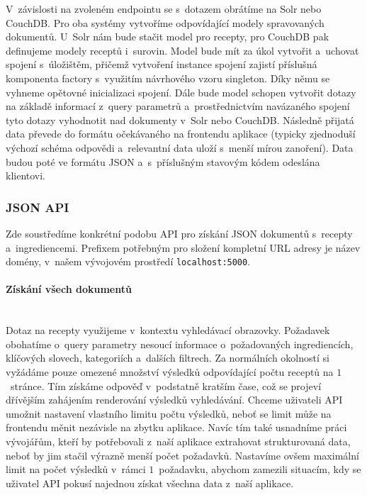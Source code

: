 V~závislosti na zvoleném endpointu se s~dotazem obrátíme na Solr nebo \,CouchDB. Pro oba systémy vytvoříme odpovídající modely spravovaných dokumentů. U~Solr nám bude stačit model pro recepty, pro CouchDB pak definujeme modely receptů i~surovin. Model bude mít za úkol vytvořit a~uchovat spojení s~úložištěm, přičemž vytvoření instance spojení zajistí příslušná komponenta factory s~využitím návrhového vzoru singleton. Díky němu se vyhneme opětovné inicializaci spojení. Dále bude model schopen vytvořit dotazy na základě informací z~query parametrů a~prostřednictvím navázaného spojení tyto dotazy vyhodnotit nad dokumenty v~Solr nebo CouchDB. Následně přijatá data převede do formátu očekávaného na frontendu aplikace (typicky zjednoduší výchozí schéma odpovědi a~relevantní data uloží s~menší mírou zanoření). Data budou poté ve formátu JSON a~s~příslušným stavovým kódem odeslána klientovi. 

\subsubsection{JSON API}

Zde soustředíme konkrétní podobu API pro získání JSON dokumentů s~recepty a~ingrediencemi. Prefixem potřebným pro složení kompletní URL adresy je název domény, v~našem vývojovém prostředí \texttt{localhost:5000}.

\paragraph{Získání všech dokumentů}\mbox{}\\

Dotaz na recepty využijeme v~kontextu vyhledávací obrazovky. Požadavek obohatíme o~query parametry nesoucí informace o~požadovaných ingrediencích, klíčových slovech, kategoriích a~dalších filtrech. Za normálních okolností si vyžádáme pouze omezené množství výsledků odpovídající počtu receptů na $1$~stránce. Tím získáme odpověď v~podstatně kratším čase, což se projeví dřívějším zahájením renderování výsledků vyhledávání. Chceme uživateli API umožnit nastavení vlastního limitu počtu výsledků, neboť se limit může na frontendu měnit nezávisle na zbytku aplikace. Navíc tím také usnadníme práci vývojářům, kteří by potřebovali z~naší aplikace extrahovat strukturovaná data, neboť by jim stačil výrazně menší počet požadavků. Nastavíme ovšem maximální limit na počet výsledků v~rámci $1$~požadavku, abychom zamezili situacím, kdy se uživatel API pokusí najednou získat všechna data z~naší aplikace.

